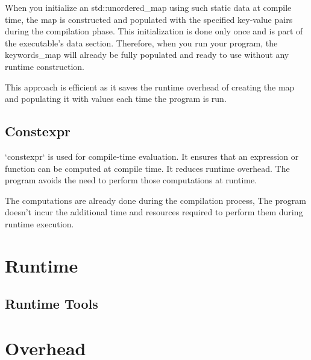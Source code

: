 When you initialize an std::unordered_map using such static data at compile time,
the map is constructed and populated with the specified key-value pairs during the compilation phase.
This initialization is done only once and is part of the executable's data section.
Therefore, when you run your program,
the keywords_map will already be fully populated and ready to use without any runtime construction.

This approach is efficient as it saves the runtime overhead of creating the map
and populating it with values each time the program is run.


\subsection{Constexpr}

`constexpr` is used for compile-time evaluation.
It ensures that an expression or function can be computed at compile time.
It reduces runtime overhead.
The program avoids the need to perform those computations at runtime. 

The computations are already done during the compilation process, 
The program doesn't incur the additional time and resources required
to perform them during runtime execution.

\section{Runtime}

\subsection{Runtime Tools}


\section{Overhead}



